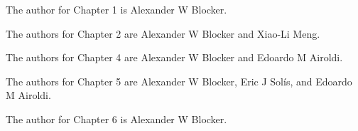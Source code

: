 \indent
The author for Chapter 1 is Alexander W Blocker.

The authors for Chapter 2 are Alexander W Blocker and Xiao-Li Meng.

The authors for Chapter 4 are Alexander W Blocker and Edoardo M Airoldi.

The authors for Chapter 5 are Alexander W Blocker, Eric J Sol\'is, and Edoardo M Airoldi.

The author for Chapter 6 is Alexander W Blocker.
